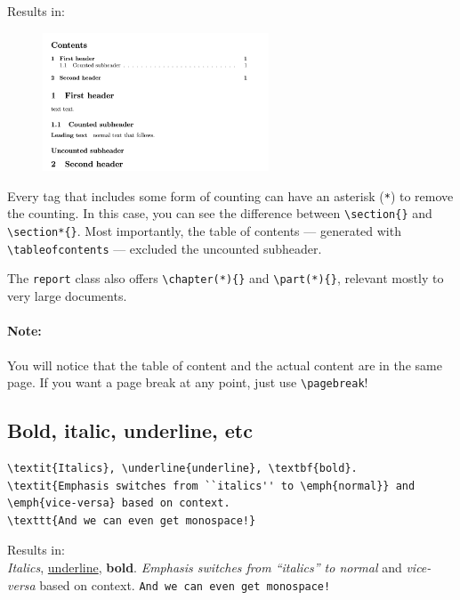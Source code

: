 Results in: \clearpage
\begin{figure}[h]
    \centering
    \includegraphics[width=0.6\textwidth]{figures/sections.png}
    \label{fig:sections}
\end{figure}

Every tag that includes some form of counting can have an asterisk (\verb|*|) to remove the counting.
In this case, you can see the difference between \verb|\section{}| and \verb|\section*{}|.
Most importantly, the table of contents --- generated with \verb|\tableofcontents| --- excluded the uncounted subheader.

The \verb|report| class also offers \verb|\chapter(*){}| and \verb|\part(*){}|, relevant mostly to very large documents.

\paragraph{Note:} You will notice that the table of content and the actual content are in the same page. If you want a page break at any point, just use \verb|\pagebreak|!

\subsection{Bold, italic, underline, etc}

\begin{lstlisting}
\textit{Italics}, \underline{underline}, \textbf{bold}.
\textit{Emphasis switches from ``italics'' to \emph{normal}} and \emph{vice-versa} based on context.
\texttt{And we can even get monospace!}
\end{lstlisting}
Results in: \\
\textit{Italics}, \underline{underline}, \textbf{bold}.
\textit{Emphasis switches from ``italics'' to \emph{normal}} and \emph{vice-versa} based on context.
\texttt{And we can even get monospace!}\\

